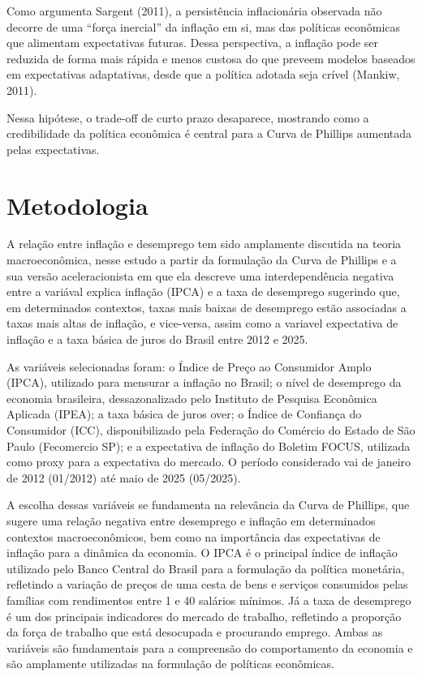 \documentclass[12pt,oneside]{abntex2}
\begin{document}
Como argumenta Sargent (2011), a persistência inflacionária observada não decorre de uma “força inercial” da inflação em si, mas das políticas econômicas que alimentam expectativas futuras. Dessa perspectiva, a inflação pode ser reduzida de forma mais rápida e menos custosa do que preveem modelos baseados em expectativas adaptativas, desde que a política adotada seja crível (Mankiw, 2011).  

Nessa hipótese, o trade-off de curto prazo desaparece, mostrando como a credibilidade da política econômica é central para a Curva de Phillips aumentada pelas expectativas.

\section{\textbf{Metodologia}}

A relação entre inflação e desemprego tem sido amplamente discutida na teoria macroeconômica, nesse estudo a partir da formulação da Curva de Phillips e a sua versão aceleracionista em que ela descreve uma interdependência negativa entre a variával explica inflação (IPCA) e a taxa de desemprego sugerindo que, em determinados contextos, taxas mais baixas de desemprego estão associadas a taxas mais altas de inflação, e vice-versa, assim como a variavel expectativa de inflação e a taxa básica de juros do Brasil entre 2012 e 2025.

As variáveis selecionadas foram: o Índice de Preço ao Consumidor Amplo (IPCA), utilizado para mensurar a inflação no Brasil; o nível de desemprego da economia brasileira, dessazonalizado pelo Instituto de Pesquisa Econômica Aplicada (IPEA); a taxa básica de juros over; o Índice de Confiança do Consumidor (ICC), disponibilizado pela Federação do Comércio do Estado de São Paulo (Fecomercio SP); e a expectativa de inflação do Boletim FOCUS, utilizada como proxy para a expectativa do mercado. O período considerado vai de janeiro de 2012 (01/2012) até maio de 2025 (05/2025).

A escolha dessas variáveis se fundamenta na relevância da Curva de Phillips, que sugere uma relação negativa entre desemprego e inflação em determinados contextos macroeconômicos, bem como na importância das expectativas de inflação para a dinâmica da economia.
O IPCA é o principal índice de inflação utilizado pelo Banco Central do Brasil para a formulação da política monetária, refletindo a variação de preços de uma cesta de bens e serviços consumidos pelas famílias com rendimentos entre 1 e 40 salários mínimos. Já a taxa de desemprego é um dos principais indicadores do mercado de trabalho, refletindo a proporção da força de trabalho que está desocupada e procurando emprego. Ambas as variáveis são fundamentais para a compreensão do comportamento da economia e são amplamente utilizadas na formulação de políticas econômicas.
\end{document}
